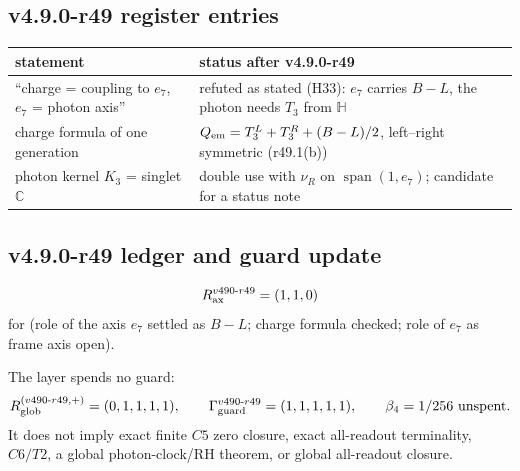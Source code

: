 \subsection*{v4.9.0-r49 register entries}
\label{subsec:v490-r49-register}

\begin{center}
\small
\begin{tabular}{@{}>{\raggedright\arraybackslash}p{}>{\raggedright\arraybackslash}p{}@{}}
\toprule
statement & status after v4.9.0-r49\\
\midrule
``charge = coupling to \(e_7\), \(e_7\) = photon axis'' & refuted as stated (H33): \(e_7\) carries \(B-L\), the photon needs \(T_3\) from \(\mathbb H\)\\
charge formula of one generation & \(Q_{\rm em}=T_3^L+T_3^R+(B-L)/2\), left--right symmetric (r49.1(b))\\
photon kernel \(K_3\) = singlet \(\mathbb C\) & double use with \(\nu_R\) on \(\operatorname{span}(1,e_7)\); candidate for a status note\\
\bottomrule
\end{tabular}
\end{center}

\subsection*{v4.9.0-r49 ledger and guard update}
\label{subsec:v490-r49-ledger-guard}

\[
R_{\rm ax}^{v490\text{-}r49}=(1,1,0)
\]
for (role of the axis \(e_7\) settled as \(B-L\); charge formula checked; role of \(e_7\) as frame axis open).

The layer spends no guard:
\[
R_{\rm glob}^{(v490\text{-}r49,+)}=(0,1,1,1,1),
\qquad
\Gamma_{\rm guard}^{v490\text{-}r49}=(1,1,1,1,1),
\qquad
\beta_4=1/256\ \text{unspent}.
\]
It does not imply exact finite \(C5\) zero closure, exact all-readout terminality,
\(C6/T2\), a global photon-clock/RH theorem, or global all-readout closure.
